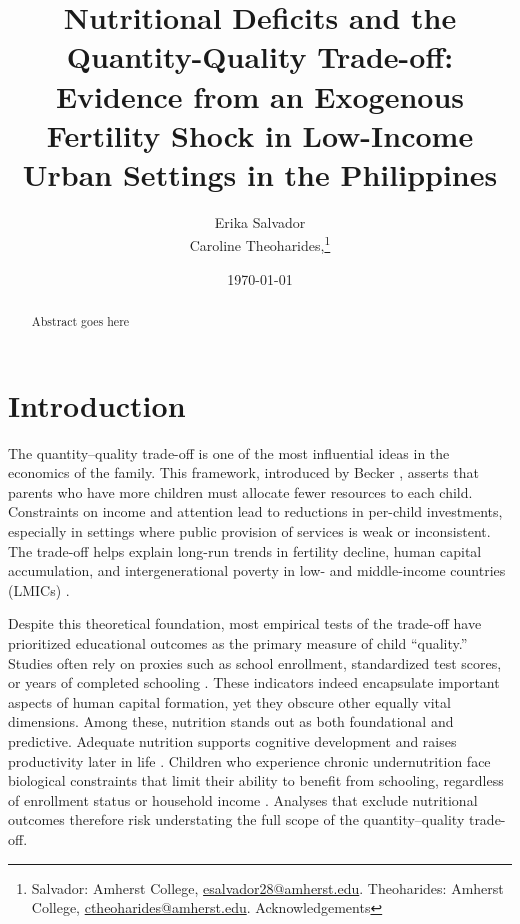 \documentclass[2025 Schupf Fellowship Project]{AEA}
\begin{document}
\title{Nutritional Deficits and the Quantity-Quality Trade-off: Evidence
from an Exogenous Fertility Shock in Low-Income Urban Settings in the
Philippines}


\author{
  Erika Salvador\\
  Caroline Theoharides,\thanks{
  Salvador: Amherst
College, \href{mailto:esalvador28@amherst.edu}{esalvador28@amherst.edu}.
  Theoharides: Amherst
College, \href{mailto:ctheoharides@amherst.edu}{ctheoharides@amherst.edu}.
  Acknowledgements
}
}

\date{\today}

\begin{abstract}
Abstract goes here
\end{abstract}


\maketitle

\section{Introduction}

The quantity--quality trade-off is one of the most influential ideas in
the economics of the family. This framework, introduced by Becker
\citep{becker1960economic, becker1991allocation}, asserts that parents
who have more children must allocate fewer resources to each child.
Constraints on income and attention lead to reductions in per-child
investments, especially in settings where public provision of services
is weak or inconsistent. The trade-off helps explain long-run trends in
fertility decline, human capital accumulation, and intergenerational
poverty in low- and middle-income countries (LMICs)
\citep{rosenzweig1980testing, schwarze2003does}.

Despite this theoretical foundation, most empirical tests of the
trade-off have prioritized educational outcomes as the primary measure
of child ``quality.'' Studies often rely on proxies such as school
enrollment, standardized test scores, or years of completed schooling
\citep{black2005more, angrist2010effects}. These indicators indeed
encapsulate important aspects of human capital formation, yet they
obscure other equally vital dimensions. Among these, nutrition stands
out as both foundational and predictive. Adequate nutrition supports
cognitive development and raises productivity later in life
\citep{hoddinott2013adult}. Children who experience chronic
undernutrition face biological constraints that limit their ability to
benefit from schooling, regardless of enrollment status or household
income \citep{grantham2007development}. Analyses that exclude
nutritional outcomes therefore risk understating the full scope of the
quantity--quality trade-off.
\end{document}
